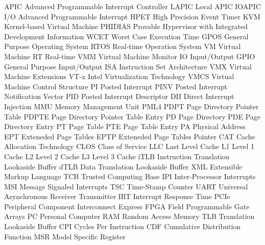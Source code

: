 
\makenoidxglossaries %
\glsdisablehyper

 {APIC} {Advanced Programmable Interrupt Controller}
 {LAPIC} {Local APIC}
 {IOAPIC} {I/O Advanced Programmable Interrupt}
 {HPET} {High Precision Event Timer}
 {KVM} {Kernel-based Virtual Machine}
 {PHIDIAS} {Provable Hypervisor with Integrated Development Information}
 {WCET} {Worst Case Execution Time}
 {GPOS} {General Purpose Operating System}
 {RTOS} {Real-time Operation System}
 {VM} {Virtual Machine}
 {RT} {Real-time}
 {VMM} {Virtual Machine Monitor}
 {IO} {Input/Output}
 {GPIO} {General Purpose Input/Output}
 {ISA} {Instruction Set Architecture}
 {VMX} {Virtual Machine Extensions}
 {VT-x} {Intel Virtualization Technology}
 {VMCS} {Virtual Machine Control Structure}
 {PI} {Posted Interrupt}
 {PINV} {Posted Interrupt Notification Vector}
 {PID} {Posted Interrupt Descriptor}
 {DII} {Direct Interrupt Injection}
 {MMU} {Memory Management Unit}
 {PML4} {}
 {PDPT} {Page Directory Pointer Table}
 {PDPTE} {Page Directory Pointer Table Entry}
 {PD} {Page Directory}
 {PDE} {Page Directory Entry}
 {PT} {Page Table}
 {PTE} {Page Table Entry}
 {PA} {Physical Address}
 {EPT} {Exteneded Page Tables}
 {EPTP} {Exteneded Page Tables Pointer}
 {CAT} {Cache Allocation Technology}
 {CLOS} {Class of Service}
 {LLC} {Last Level Cache}
 {L1} {Level 1 Cache}
 {L2} {Level 2 Cache}
 {L3} {Level 3 Cache}
 {iTLB} {Instruction Translation Lookaside Buffer}
 {dTLB} {Data Translation Lookaside Buffer}
 {XML} {Extensible Markup Language}
 {TCB} {Trusted Computing Base}
 {IPI} {Inter-Processor Interrupts}
 {MSI} {Message Signaled Interrupts}
 {TSC} {Time-Stamp Counter}
 {UART} {Universal Asynchronous Receiver Transmitter}
 {IRT} {Interrupt Response Time}
 {PCIe} {Peripheral Component Interconnect Express}
 {FPGA} {Field Programmable Gate Arrays}
 {PC} {Personal Computer}
 {RAM} {Random Access Memory}
 {TLB} {Translation Lookaside Buffer}
 {CPI} {Cycles Per Instruction}
 {CDF} {Cumulative Distribution Function}
 {MSR} {Model Specific Register}
